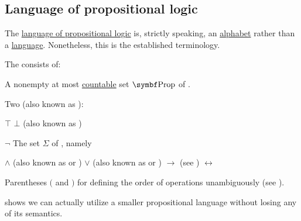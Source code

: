 \subsection{Language of propositional logic}\label{subsec:language_of_propositional_logic}

\begin{remark}\label{rem:propositional_language_is_alphabet}
  The \hyperref[def:propositional_language]{language of propositional logic} is, strictly speaking, an \hyperref[def:language/alphabet]{alphabet} rather than a \hyperref[def:language/language]{language}. Nonetheless, this is the established terminology.
\end{remark}

\begin{definition}\label{def:propositional_language}\mcite\cite[102]{OpenLogic20201202}
  The  consists of:

  \begin{defenum}
     A nonempty at most \hyperref[rem:cardinals/countable]{countable} set \( \bfop{Prop} \) of .

     Two  (also known as ):
    \begin{defenum}
        \( \top \)
        \( \bot \) (also known as )
    \end{defenum}

      \( \neg \)
     The set \( \Sigma \) of , namely
    \begin{defenum}
        \( \wedge \) (also known as \hyperref[def:standard_boolean_operators]{} or \hyperref[def:lattice_operations]{})
        \( \vee \) (also known as \hyperref[def:standard_boolean_operators]{} or \hyperref[def:lattice_operations]{})
        \( \to \) (see )
        \( \leftrightarrow \)
    \end{defenum}

     Parentheses \( ( \) and \( ) \) for defining the order of operations unambiguously (see ).
  \end{defenum}

   shows we can actually utilize a smaller propositional language without losing any of its semantics.
\end{definition}

